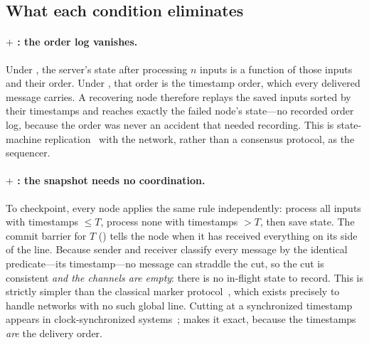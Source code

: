 \subsection{What each condition eliminates}
\label{sec:props}

\paragraph{\Order $+$ \Determinism: the order log vanishes.} Under
\Determinism, the server's state
after processing $n$ inputs is a function of those inputs and their order.
Under \Order, that order is the timestamp order, which every delivered
message carries. A recovering node therefore replays the saved inputs
sorted by their timestamps and reaches exactly the failed node's state---no
recorded order log, because the order was never an accident that needed
recording. This is state-machine
replication~\citep{schneider1990smr} with the network, rather than a
consensus protocol, as the sequencer.

\paragraph{\Order $+$ \Barrier: the snapshot needs no coordination.} To
checkpoint,
every node applies the same rule independently: process all inputs with
timestamps $\le T$, process none with timestamps $>T$, then save state. The
commit barrier for $T$ (\Barrier) tells the node when it has received
everything on its side of the line. Because sender and receiver classify
every message by the identical predicate---its timestamp---no message can
straddle the cut, so the cut is consistent \emph{and the channels are
empty}: there is no in-flight state to record. This is strictly simpler
than the classical marker protocol~\citep{chandy1985snapshots}, which
exists precisely to handle networks with no such global line. Cutting at a
synchronized timestamp appears in clock-synchronized
systems~\citep{corbett2012spanner,geng2018huygens}; \Order makes it exact,
because the timestamps \emph{are} the delivery order.

